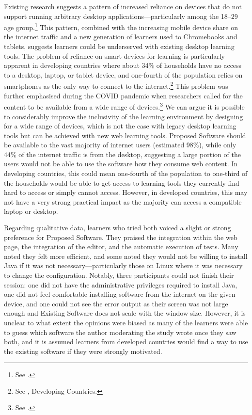 Existing research suggests a pattern of increased reliance on devices that do not support running arbitrary desktop applications---particularly among the 18--29 age group.\footnote{See .}
This pattern, combined with the increasing mobile device share on the internet traffic and a new generation of learners used to Chromebooks and tablets, suggests learners could be underserved with existing desktop learning tools.
The problem of reliance on smart devices for learning is particularly apparent in developing countries where about 34\% of households have no access to a desktop, laptop, or tablet device, and one-fourth of the population relies on smartphones as the only way to connect to the internet.\footnote{See , Developing Countries.}
This problem was further emphasised during the COVID pandemic when researchers called for the content to be available from a wide range of devices.\footnote{See .}
We can argue it is possible to considerably improve the inclusivity of the learning environment by designing for a wide range of devices, which is not the case with legacy desktop learning tools but can be achieved with new web learning tools.
Proposed Software should be available to the vast majority of internet users (estimated 98\%), while only 44\% of the internet traffic is from the desktop, suggesting a large portion of the users would not be able to use the software how they consume web content.
In developing countries, this could mean one-fourth of the population to one-third of the households would be able to get access to learning tools they currently find hard to access or simply cannot access.
However, in developed countries, this may not have a very strong practical impact as the majority can access a compatible laptop or desktop.

Regarding qualitative data, learners who tried both voiced a slight or strong preference for Proposed Software.
They praised the integration within the web page, the integration of the editor, and the automatic execution of tests.
Many noted they felt more efficient, and some noted they would not be willing to install Java if it was not necessary---particularly those on Linux where it was necessary to change the configuration.
Notably, three participants could not finish their session: one did not have the administrative privileges required to install Java, one did not feel comfortable installing software from the internet on the given device, and one could not see the error output as their screen was not large enough and Existing Software does not scale with the window size.
However, it is unclear to what extent the opinions were biased as many of the learners were able to guess which software the author moderating the study wrote once they saw both, and it is assumed learners from developed countries would find a way to use the existing software if they were strongly motivated.

